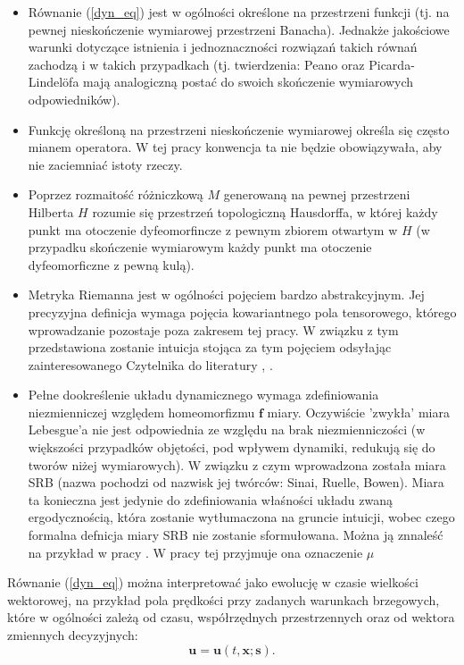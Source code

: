 \documentclass[12pt, twoside]{book}
\begin{document}
\begin{itemize}
	\item Równanie (\ref{dyn_eq}) jest w ogólności określone na przestrzeni funkcji (tj. na pewnej nieskończenie wymiarowej przestrzeni Banacha). Jednakże jakościowe warunki dotyczące istnienia i jednoznaczności rozwiązań takich równań zachodzą i w takich przypadkach (tj. twierdzenia: Peano oraz Picarda-Lindelöfa mają analogiczną postać do swoich skończenie wymiarowych odpowiedników).
	\item Funkcję określoną na przestrzeni nieskończenie wymiarowej określa się często mianem operatora. W tej pracy konwencja ta nie będzie obowiązywała, aby nie zaciemniać istoty rzeczy.
	\item Poprzez rozmaitość różniczkową $ M $ generowaną na pewnej przestrzeni Hilberta $ H $ rozumie się przestrzeń topologiczną Hausdorffa, w której każdy punkt ma otoczenie dyfeomorfincze z pewnym zbiorem otwartym w $ H$ (w przypadku skończenie wymiarowym każdy punkt ma otoczenie dyfeomorficzne z pewną kulą).
	\item Metryka Riemanna jest w ogólności pojęciem bardzo abstrakcyjnym. Jej precyzyjna definicja wymaga pojęcia kowariantnego pola tensorowego, którego wprowadzanie pozostaje poza zakresem tej pracy. W związku z tym przedstawiona zostanie intuicja stojąca za tym pojęciem odsyłając zainteresowanego Czytelnika do literatury \cite{Blackmore}, \cite{Maurin2}.
	\item Pełne dookreślenie układu dynamicznego wymaga zdefiniowania niezmienniczej względem homeomorfizmu $ \textbf{f} $ miary. Oczywiście 'zwykła' miara Lebesgue'a nie jest odpowiednia ze względu na brak niezmienniczości (w większości przypadków objętości, pod wpływem dynamiki, redukują się do tworów niżej wymiarowych). W związku z czym wprowadzona została miara SRB (nazwa pochodzi od nazwisk jej twórców: Sinai, Ruelle, Bowen). Miara ta konieczna jest jedynie do zdefiniowania właśności układu zwaną ergodycznością, która zostanie wytłumaczona na gruncie intuicji, wobec czego formalna defnicja miary SRB nie zostanie sformułowana. Można ją znnaleść na przykład w pracy \cite{Ruelle1}. W pracy tej przyjmuje ona oznaczenie $\mu$
\end{itemize}
Równanie (\ref{dyn_eq}) można interpretować jako ewolucję w czasie wielkości wektorowej, na przykład pola prędkości przy zadanych warunkach brzegowych, które w ogólności zależą od czasu, współrzędnych przestrzennych oraz od wektora zmiennych decyzyjnych:
\begin{equation}
\textbf{u} = \textbf{u}(t,
\textbf{x};\textbf{s}).
\label{utxs}
\end{equation}
\end{document}
